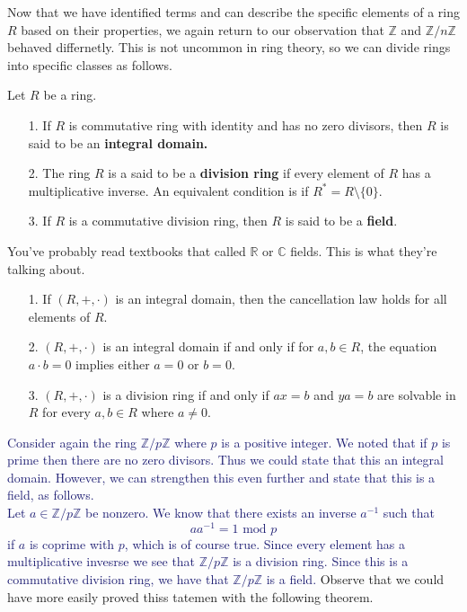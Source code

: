 \documentclass[12pt,letterpaper]{algebra_book}
\newcommand{\ZZ}{\mathbb{Z}}
\newcommand{\zz}{\mathbb{Z}}
\theoremstyle{definition}
\begin{document}
    \textcolor{NavyBlue}{Now that we have identified terms and can
    describe the specific elements of a ring $R$ based on their
    properties, we again return to our observation that $\ZZ$ and
    $\ZZ/n\ZZ$ behaved differnetly. This is not uncommon in ring
    theory, so we can divide rings into specific classes as
    follows.}
    
    \begin{definition}
        Let $R$ be a ring. 
        \begin{itemize}
            \item[1.] If $R$ is commutative ring with identity and has
            no zero divisors, then $R$ is said to be an
            \textbf{integral domain.}
            \item[2.] The ring $R$ is a said to be a \textbf{division ring}
            if every element of $R$ has a multiplicative inverse.
            An equivalent condition is if $R^* = R\setminus
            \{0\}$.
            \item[3.] If $R$ is a commutative division ring, then
            $R$ is said to be a \textbf{field}.
        \end{itemize}
    \end{definition}

    You've probably read textbooks that called $\mathbb{R}$ or
    $\mathbb{C}$ fields. This is what they're talking about. 

    \begin{proposition}
        \begin{itemize}
            \item[1.] If $(R, +, \cdot)$ is an integral domain, then the
            cancellation law holds for all elements of $R$. 

            \item[2.] $(R, +, \cdot)$ is an integral domain if and
            only if for $a, b \in R$, the equation $a\cdot b = 0$
            implies either $a = 0$ or $b = 0$. 

            \item[3.] $(R, +, \cdot)$ is a division ring if and only if $ax =
            b$ and $ya = b$ are solvable in $R$ for every $a, b \in R$
            where $a \ne 0 $.
        \end{itemize}
    \end{proposition}

    \textcolor{MidnightBlue}{Consider again the ring $\ZZ/p\ZZ$
    where $p$ is a positive integer. We noted that if $p$ is
    prime then there are no zero divisors. Thus we could state
    that this an integral domain. However, we can strengthen
    this even further and state that this is a field, as follows.
    \\
    \indent Let $a \in \ZZ/p\ZZ$ be nonzero. We know that there exists an
    inverse $a^{-1}$ such that 
    \[ 
        aa^{-1} = 1 \mbox{ mod } p 
    \] 
    if $a$ is coprime with $p$, which is of course true. Since
    every element has a multiplicative invesrse we see that
    $\ZZ/p\ZZ$ is a division ring. Since this is a commutative
    division ring, we have that $\zz/p\zz$ is a field.
    }
    Observe that we could have more easily proved thiss tatemen
    with the following theorem.
    
\end{document}
